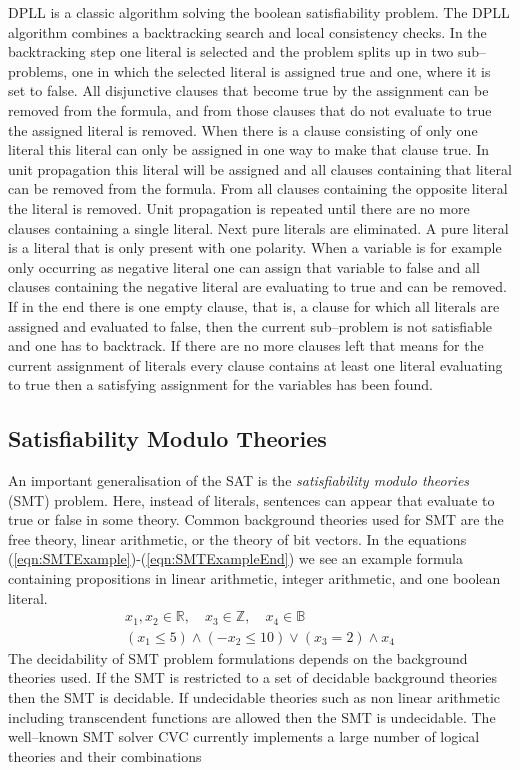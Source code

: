 DPLL \cite{DPLL} is a classic algorithm solving the boolean satisfiability problem. The DPLL algorithm combines a backtracking search and local consistency checks. In the backtracking step one literal is selected and the problem splits up in two sub--problems, one in which the selected literal is assigned true and one, where it is set to false. All disjunctive clauses that become true by the assignment can be removed from the formula, and from those clauses that do not evaluate to true the assigned literal is removed. When there is a clause consisting of only one literal this literal can only be assigned in one way to make that clause true. In unit propagation this literal will be assigned and all clauses containing that literal can be removed from the formula. From all clauses containing the opposite literal the literal is removed. Unit propagation is repeated until there are no more clauses containing a single literal. Next pure literals are eliminated. A pure literal is a literal that is only present with one polarity. When a variable is for example only occurring as negative literal one can assign that variable to false and all clauses containing the negative literal are evaluating to true and can be removed. If in the end there is one empty clause, that is, a clause for which all literals are assigned and evaluated to false, then the current sub--problem is not satisfiable and one has to backtrack. If there are no more clauses left that means for the current assignment of literals every clause contains at least one literal evaluating to true then a satisfying assignment for the variables has been found.
\subsection{Satisfiability Modulo Theories}
\label{sec:MathSMT}
An important generalisation of the SAT is the \emph{satisfiability modulo theories} (SMT) problem. Here, instead of literals, sentences can appear that evaluate to true or false in some theory. Common background theories used for SMT are the free theory, linear arithmetic, or the theory of bit vectors. In the equations (\ref{eqn:SMTExample})-(\ref{eqn:SMTExampleEnd}) we see an example formula containing propositions in linear arithmetic, integer arithmetic, and one boolean literal.
\begin{eqnarray}
\label{eqn:SMTExample}
x_1,x_2\in \mathbb{R}, \quad x_3 \in \mathbb{Z},\quad x_4\in \mathbb{B}\\
\label{eqn:SMTExampleEnd}
(x_1\leq 5) \land (-x_2\leq 10) \lor (x_3=2) \land x_4
\end{eqnarray}
The decidability of SMT problem formulations depends on the background theories used. If the SMT is restricted to a set of decidable background theories then the SMT is decidable. If undecidable theories such as non linear arithmetic including transcendent functions are allowed then the SMT is undecidable. The well--known SMT solver CVC currently implements a large number of logical theories and their combinations \cite{cvc}\\
